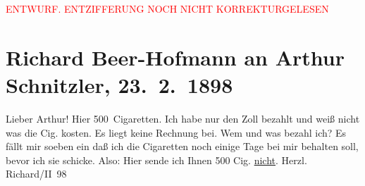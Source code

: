 
\begin{center}
            \textcolor{red}{ENTWURF. ENTZIFFERUNG NOCH NICHT KORREKTURGELESEN}
                      \end{center}
            
               \section[Richard Beer-Hofmann an Arthur Schnitzler, 23. 2. 1898]{ Richard Beer-Hofmann an Arthur Schnitzler, 23. 2. 1898}\nopagebreak{}\rehead{ }\begin{ledgroupsized}[t]{13cm}\normalsize\beginnumbering{} \toendnotes[C]{\smallbreak\pagebreak[2]} 
\pstart
           \noindent{}{\pb}Lieber Arthur!
               Hier 500 Cigaretten. Ich habe nur den Zoll bezahlt und weiß nicht was die
               Cig. kosten. Es liegt keine Rechnung bei. Wem und was bezahl ich? Es fällt mir soeben
               ein daß ich die Cigaretten {\pb}noch
               einige Tage bei mir behalten soll, bevor ich sie schicke. Also: Hier sende ich Ihnen
               500 Cig. \uline{nicht}.\pend
           \pstart Herzl. \spacefill\mbox{Richard}\pend{}/II 98\pend
           \endnumbering{}\end{ledgroupsized}  \newcommand{\dateiname}{L00776}\newcommand{\titel}{Richard Beer-Hofmann an Arthur Schnitzler, 23. 2. 1898}\newcommand{\editorInnen}{Martin Anton Müller und Gerd-Hermann Susen}
      